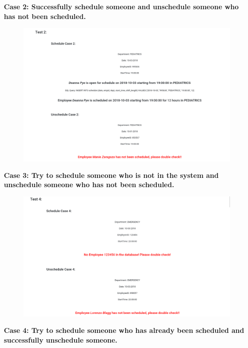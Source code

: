 \documentclass[11pt]{article}
\makeatletter
\def\maxwidth{\ifdim\Gin@nat@width>\linewidth\linewidth
    \else\Gin@nat@width\fi}
\let\Oldincludegraphics\includegraphics
\renewcommand{\includegraphics}[1]{\Oldincludegraphics[width=.8\maxwidth]{#1}}
\makeatother
\begin{document}
\noindent    \textbf{Case 2: Successfully schedule someone and unschedule someone who has not been scheduled.}

\begin{figure}[H]
        \centering
        \includegraphics{../hw9/5.png}
        \caption{}
    \end{figure}

\noindent    \textbf{Case 3: Try to schedule someone who is not in the system and  unschedule someone who has not been scheduled.}

\begin{figure}[H]
        \centering
        \includegraphics{../hw9/7.png}
        \caption{}
    \end{figure}

\noindent    \textbf{Case 4: Try to schedule someone who has already been scheduled and  successfully unschedule someone.}
\end{document}
